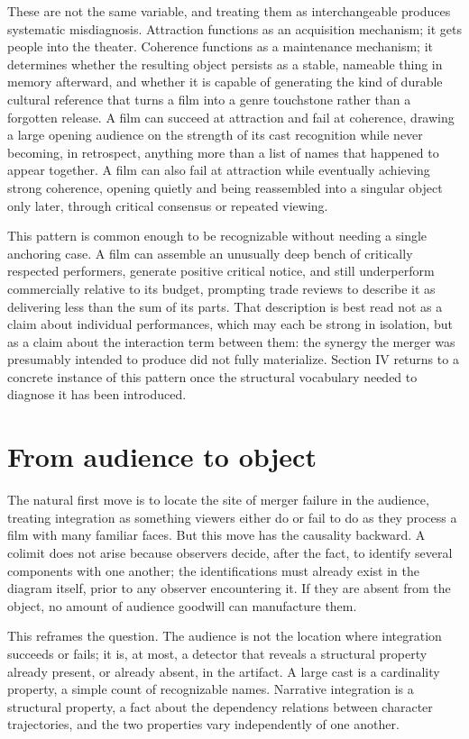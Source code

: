 \documentclass[11pt]{article}
\begin{document}
These are not the same variable, and treating them as interchangeable produces systematic misdiagnosis. Attraction functions as an acquisition mechanism; it gets people into the theater. Coherence functions as a maintenance mechanism; it determines whether the resulting object persists as a stable, nameable thing in memory afterward, and whether it is capable of generating the kind of durable cultural reference that turns a film into a genre touchstone rather than a forgotten release. A film can succeed at attraction and fail at coherence, drawing a large opening audience on the strength of its cast recognition while never becoming, in retrospect, anything more than a list of names that happened to appear together. A film can also fail at attraction while eventually achieving strong coherence, opening quietly and being reassembled into a singular object only later, through critical consensus or repeated viewing.

This pattern is common enough to be recognizable without needing a single anchoring case. A film can assemble an unusually deep bench of critically respected performers, generate positive critical notice, and still underperform commercially relative to its budget, prompting trade reviews to describe it as delivering less than the sum of its parts. That description is best read not as a claim about individual performances, which may each be strong in isolation, but as a claim about the interaction term between them: the synergy the merger was presumably intended to produce did not fully materialize. Section IV returns to a concrete instance of this pattern once the structural vocabulary needed to diagnose it has been introduced.

\section{From audience to object}

The natural first move is to locate the site of merger failure in the audience, treating integration as something viewers either do or fail to do as they process a film with many familiar faces. But this move has the causality backward. A colimit does not arise because observers decide, after the fact, to identify several components with one another; the identifications must already exist in the diagram itself, prior to any observer encountering it. If they are absent from the object, no amount of audience goodwill can manufacture them.

This reframes the question. The audience is not the location where integration succeeds or fails; it is, at most, a detector that reveals a structural property already present, or already absent, in the artifact. A large cast is a cardinality property, a simple count of recognizable names. Narrative integration is a structural property, a fact about the dependency relations between character trajectories, and the two properties vary independently of one another.
\end{document}
